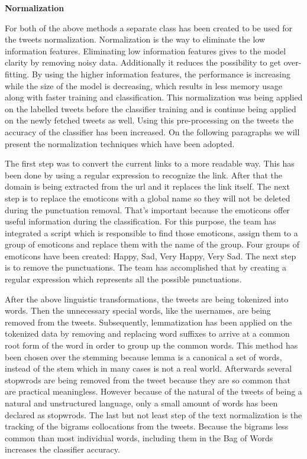 \textbf{Normalization}

For both of the above methods a separate class has been created to be used for the tweets normalization. Normalization is the way to eliminate the low information features. Eliminating low information features gives to the model clarity by removing noisy data. Additionally it reduces the possibility to get over-fitting. By using the higher information features, the performance is increasing while the size of the model is decreasing, which results in less memory usage along with faster training and classification. This normalization was being applied on the labelled tweets before the classifier training and is continue being applied on the newly fetched tweets as well. Using this pre-processing on the tweets the accuracy of the classifier has been increased. On the following paragraphs we will present the normalization techniques which have been adopted. 

The first step was to convert the current links to a more readable way. This has been done by using a regular expression to recognize the link. After that the domain is being extracted from the url and it replaces the link itself. The next step is to replace the emoticons with a global name so they will not be deleted during the punctuation removal. That’s important because the emoticons offer useful information during the classification. For this purpose, the team has integrated a script which is responsible to find those emoticons, assign them to a group of emoticons and replace them with the name of the group. Four groups of emoticons have been created: Happy, Sad, Very Happy, Very Sad. The next step is to remove the punctuations. The team has accomplished that by creating a regular expression which represents all the possible punctuations. 

After the above linguistic transformations, the tweets are being tokenized into words. Then the unnecessary special words, like the usernames, are being removed from the tweets. Subsequently, lemmatization has been applied on the tokenized data by removing and replacing word suffixes to arrive at a common root form of the word in order to group up the common words. This method has been chosen over the stemming because lemma is a canonical a set of words, instead of the stem which in many cases is not a real world. Afterwards several stopwrods are being removed from the tweet because they are so common that are practical meaningless. However because of the natural of the tweets of being a natural and unstructured language, only a small amount of words has been declared as stopwrods. The last but not least step of the text normalization is the tracking of the bigrams collocations from the tweets. Because the bigrams less common than most individual words, including them in the Bag of Words increases the classifier accuracy.

